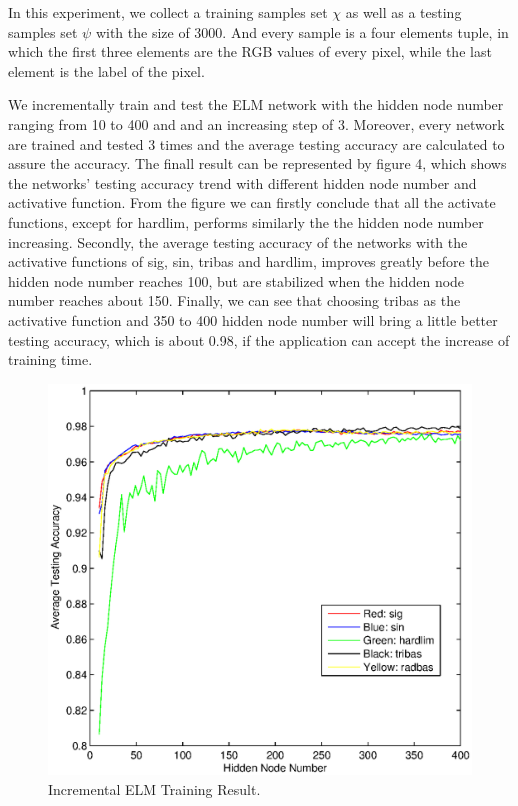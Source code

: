 \documentclass{elsart}
\begin{document}
In this experiment, we collect a training samples set $\chi$ as well as a testing samples set $\psi$ with the size of 3000.
And every sample is a four elements tuple, in which the first three elements are the RGB values of every pixel, while the last element is the label of the pixel. 
\par

We incrementally train and test the ELM network with the hidden node number ranging from 10 to 400 and and an increasing step of 3. 
Moreover, every network are trained and tested 3 times and the average testing accuracy are calculated to assure the accuracy.
The finall result can be represented by figure 4, which shows the networks' testing accuracy trend with different hidden node number and activative function.
From the figure we can firstly conclude that all the activate functions, except for hardlim, performs similarly the the hidden node number increasing.
Secondly, the average testing accuracy of the networks with the activative functions of sig, sin, tribas and hardlim, improves greatly before the hidden node number reaches 100, but are stabilized when the hidden node number reaches about 150.
Finally, we can see that choosing tribas as the activative function and 350 to 400 hidden node number will bring a little better testing accuracy, which is about 0.98, if the application can accept the increase of training time.  
\begin{figure}[tbh]
\begin{center}
\includegraphics[width=15cm]{itr.eps}
\caption{Incremental ELM Training Result.}
\label{method}
\end{center}
\end{figure}
\par
\end{document}
